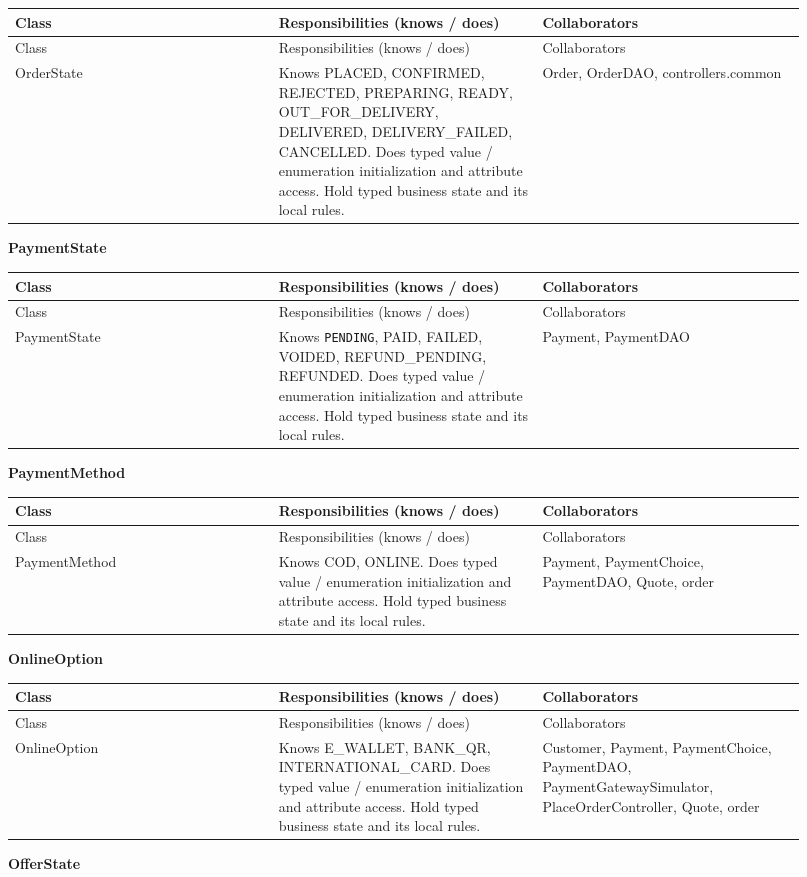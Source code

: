 \begin{longtable}{>{\raggedright\arraybackslash}p{0.3067\linewidth}>{\raggedright\arraybackslash}p{0.3067\linewidth}>{\raggedright\arraybackslash}p{0.3067\linewidth}}
Class & Responsibilities (knows / does) & Collaborators \\
\hline\endfirsthead
Class & Responsibilities (knows / does) & Collaborators \\
\hline\endhead
OrderState & Knows PLACED, CONFIRMED, REJECTED, PREPARING, READY, OUT\_FOR\_DELIVERY, DELIVERED, DELIVERY\_FAILED, CANCELLED. Does typed value / enumeration initialization and attribute access. Hold typed business state and its local rules. & Order, OrderDAO, controllers.common \\
\end{longtable}
\textbf{PaymentState}

\begin{longtable}{>{\raggedright\arraybackslash}p{0.3067\linewidth}>{\raggedright\arraybackslash}p{0.3067\linewidth}>{\raggedright\arraybackslash}p{0.3067\linewidth}}
Class & Responsibilities (knows / does) & Collaborators \\
\hline\endfirsthead
Class & Responsibilities (knows / does) & Collaborators \\
\hline\endhead
PaymentState & Knows \texttt{PENDING}, PAID, FAILED, VOIDED, REFUND\_PENDING, REFUNDED. Does typed value / enumeration initialization and attribute access. Hold typed business state and its local rules. & Payment, PaymentDAO \\
\end{longtable}
\textbf{PaymentMethod}

\begin{longtable}{>{\raggedright\arraybackslash}p{0.3067\linewidth}>{\raggedright\arraybackslash}p{0.3067\linewidth}>{\raggedright\arraybackslash}p{0.3067\linewidth}}
Class & Responsibilities (knows / does) & Collaborators \\
\hline\endfirsthead
Class & Responsibilities (knows / does) & Collaborators \\
\hline\endhead
PaymentMethod & Knows COD, ONLINE. Does typed value / enumeration initialization and attribute access. Hold typed business state and its local rules. & Payment, PaymentChoice, PaymentDAO, Quote, order \\
\end{longtable}
\textbf{OnlineOption}

\begin{longtable}{>{\raggedright\arraybackslash}p{0.3067\linewidth}>{\raggedright\arraybackslash}p{0.3067\linewidth}>{\raggedright\arraybackslash}p{0.3067\linewidth}}
Class & Responsibilities (knows / does) & Collaborators \\
\hline\endfirsthead
Class & Responsibilities (knows / does) & Collaborators \\
\hline\endhead
OnlineOption & Knows E\_WALLET, BANK\_QR, INTERNATIONAL\_CARD. Does typed value / enumeration initialization and attribute access. Hold typed business state and its local rules. & Customer, Payment, PaymentChoice, PaymentDAO, PaymentGatewaySimulator, PlaceOrderController, Quote, order \\
\end{longtable}
\textbf{OfferState}

